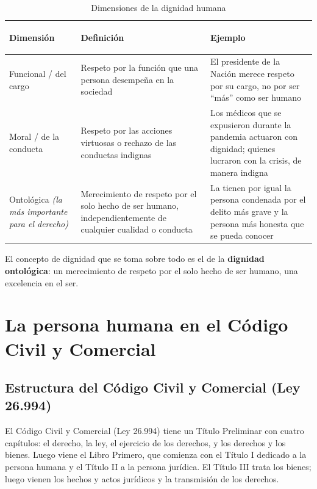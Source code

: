 \documentclass[12pt,oneside]{book}
\begin{document}
\begin{table}[H]
\centering
\begin{tabularx}{\textwidth}{>{\bfseries\raggedright\arraybackslash}p{} >{\raggedright\arraybackslash}p{} X}
\toprule
\textbf{Dimensión} & \textbf{Definición} & \textbf{Ejemplo} \\
\midrule
Funcional / del cargo & Respeto por la función que una persona desempeña en la sociedad & El presidente de la Nación merece respeto por su cargo, no por ser ``más'' como ser humano \\
Moral / de la conducta & Respeto por las acciones virtuosas o rechazo de las conductas indignas & Los médicos que se expusieron durante la pandemia actuaron con dignidad; quienes lucraron con la crisis, de manera indigna \\
Ontológica \textit{(la más importante para el derecho)} & Merecimiento de respeto por el solo hecho de ser humano, independientemente de cualquier cualidad o conducta & La tienen por igual la persona condenada por el delito más grave y la persona más honesta que se pueda conocer \\
\bottomrule
\end{tabularx}
\caption{Dimensiones de la dignidad humana}
\end{table}

\begin{important}
El concepto de dignidad que se toma sobre todo es el de la \textbf{dignidad ontológica}: un merecimiento de respeto por el solo hecho de ser humano, una excelencia en el ser.
\end{important}

\chapter{La persona humana en el Código Civil y Comercial}

\section{Estructura del Código Civil y Comercial (Ley 26.994)}

El Código Civil y Comercial (Ley 26.994) tiene un Título Preliminar con cuatro capítulos: el derecho, la ley, el ejercicio de los derechos, y los derechos y los bienes. Luego viene el Libro Primero, que comienza con el Título I dedicado a la persona humana y el Título II a la persona jurídica. El Título III trata los bienes; luego vienen los hechos y actos jurídicos y la transmisión de los derechos.
\end{document}
